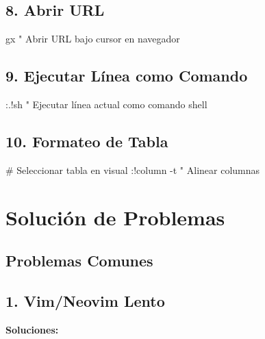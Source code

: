 \documentclass[
  doc,
  floatsintext,
  longtable,
  a4paper,
  nolmodern,
  notxfonts,
  notimes,
  12pt,
  colorlinks=true,linkcolor=blue,citecolor=blue,urlcolor=blue]{apa7}
\newenvironment{Shaded}{\begin{snugshade}}{\end{snugshade}}
\newcommand{\NormalTok}[1]{\textcolor[rgb]{0.00,0.23,0.31}{#1}}
\begin{document}
\subsection{8. Abrir URL}\label{abrir-url}

\begin{Shaded}
\begin{Highlighting}[]
\NormalTok{gx      " Abrir URL bajo cursor en navegador}
\end{Highlighting}
\end{Shaded}

\subsection{9. Ejecutar Línea como
Comando}\label{ejecutar-luxednea-como-comando}

\begin{Shaded}
\begin{Highlighting}[]
\NormalTok{:.!sh   " Ejecutar línea actual como comando shell}
\end{Highlighting}
\end{Shaded}

\subsection{10. Formateo de Tabla}\label{formateo-de-tabla}

\begin{Shaded}
\begin{Highlighting}[]
\NormalTok{\# Seleccionar tabla en visual}
\NormalTok{:!column {-}t     " Alinear columnas}
\end{Highlighting}
\end{Shaded}

\section{Solución de Problemas}\label{soluciuxf3n-de-problemas}

\subsection{Problemas Comunes}\label{problemas-comunes}

\subsection{1. Vim/Neovim Lento}\label{vimneovim-lento}

\textbf{Soluciones:}
\end{document}
